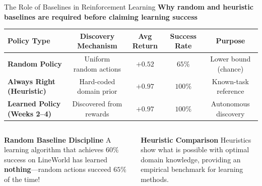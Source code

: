 \documentclass[aspectratio=169,10pt]{beamer}
\newcommand{\sectionlabel}[1]{%
  {\small\bfseries\color{islteal}#1}\par\vspace{0.14cm}%
}
\begin{document}
\begin{frame}{The Role of Baselines in Reinforcement Learning}
  \sectionlabel{Why random and heuristic baselines are required before claiming learning success}

  \renewcommand{\arraystretch}{1.20}
  \setlength{\tabcolsep}{6pt}
  {\centering
    \footnotesize
    \begin{tabular}{@{}lcccc@{}}
      \toprule
      \textbf{Policy Type} & \textbf{Discovery Mechanism} & \textbf{Avg Return} & \textbf{Success Rate} & \textbf{Purpose} \\
      \midrule
      \textbf{Random Policy} & Uniform random actions & $+0.52$ & $65\%$ & Lower bound (chance) \\
      \textbf{Always Right (Heuristic)} & Hard-coded domain prior & $+0.97$ & $100\%$ & Known-task reference \\
      \textbf{Learned Policy (Weeks 2--4)} & Discovered from rewards & $+0.97$ & $100\%$ & Autonomous discovery \\
      \bottomrule
    \end{tabular}
  \par}

  \vspace{0.25cm}
  \begin{columns}[T,onlytextwidth]
      \begin{block}{\small\color{islteal}\textbf{Random Baseline Discipline}}
        \footnotesize A learning algorithm that achieves $60\%$ success on LineWorld has learned \textbf{nothing}—random actions succeed $65\%$ of the time!
      \end{block}
      \begin{block}{\small\color{islnavy}\textbf{Heuristic Comparison}}
        \footnotesize Heuristics show what is possible with optimal domain knowledge, providing an empirical benchmark for learning methods.
      \end{block}
  \end{columns}
\end{frame}
\end{document}

